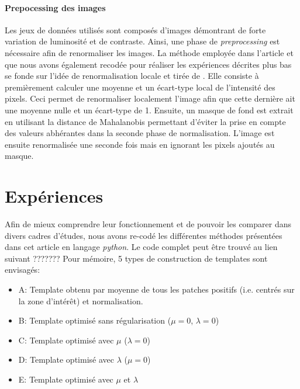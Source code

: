 \documentclass{article}
\begin{document}
\paragraph{Prepocessing des images}
Les jeux de données utilisés sont composés d'images démontrant de forte variation de luminosité et de contraste. Ainsi, une 
phase de \textit{preprocessing} est nécessaire afin de renormaliser les images. La méthode employée dans l'article et que nous 
avons également recodée pour réaliser les expériences décrites plus bas se fonde sur l'idée de renormalisation locale et tirée de \cite{preprocessing}. Elle consiste
à premièrement calculer une moyenne et un écart-type local de l'intensité des pixels. Ceci permet de renormaliser localement l'image afin 
que cette dernière ait une moyenne nulle et un écart-type de 1. Ensuite, un masque de fond est extrait en utilisant la distance de Mahalanobis 
permettant d'éviter la prise en compte des valeurs abhérantes dans la seconde phase de normalisation. L'image est ensuite renormalisée une seconde 
fois mais en ignorant les pixels ajoutés au masque.



\section{Expériences} \label{part:expe}

Afin de mieux comprendre leur fonctionnement et de pouvoir les comparer dans 
divers cadres d'études, nous avons re-codé les différentes méthodes présentées dans cet article 
en langage \textit{python}. Le code complet peut être trouvé au lien suivant ???????
Pour mémoire, 5 types de construction de templates sont envisagés:
\begin{itemize}
    \item A: Template obtenu par moyenne de tous les patches positifs (i.e. centrés sur la zone d'intérêt) et normalisation.
    \item B: Template optimisé sans régularisation ($\mu =0$, $\lambda = 0$)
    \item C: Template optimisé avec $\mu$ ($\lambda=0$)
    \item D: Template optimisé avec $\lambda$ ($\mu = 0$)
    \item E: Template optimisé avec $\mu$ et $\lambda$
\end{itemize}
\end{document}
